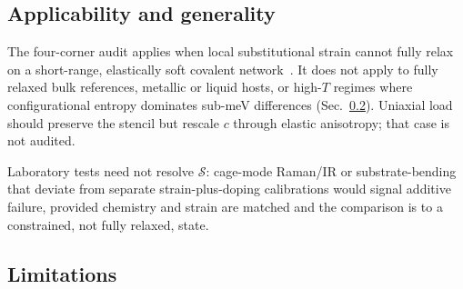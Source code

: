 \documentclass[%
 reprint,
 groupedaddress,
 amsmath,amssymb,
 aps,
 prb,
 floatfix,
]{revtex4-2}
\begin{document}
\subsection{Applicability and generality}
\label{sec:applicability}

The four-corner audit applies when local substitutional strain cannot fully relax on a short-range, elastically soft covalent network~\cite{Makov2023graphullerene,Alihosseini2023strain}.
It does not apply to fully relaxed bulk references, metallic or liquid hosts, or high-$T$ regimes where configurational entropy dominates sub-meV differences (Sec.~\ref{sec:discussion_limitations}).
Uniaxial load should preserve the stencil but rescale $c$ through elastic anisotropy; that case is not audited.

Laboratory tests need not resolve $\mathcal{S}$: cage-mode Raman/IR or substrate-bending that deviate from separate strain-plus-doping calibrations would signal additive failure, provided chemistry and strain are matched and the comparison is to a constrained, not fully relaxed, state.

\subsection{Limitations}
\label{sec:discussion_limitations}
\end{document}
